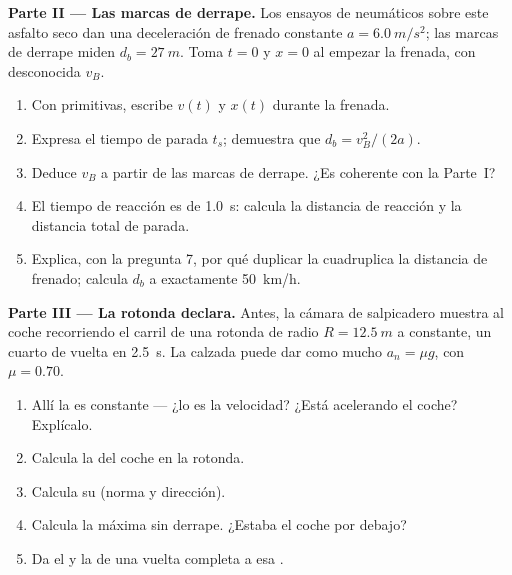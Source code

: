 \begin{problem}
\medskip
\noindent\textbf{Parte II --- Las marcas de derrape.}
Los ensayos de neumáticos sobre este asfalto seco dan una deceleración
de frenado constante $a = \qty{6.0}{m/s^2}$; las marcas de derrape miden
$d_b = \qty{27}{m}$. Toma $t = 0$ y $x = 0$ al empezar la frenada, con
 desconocida $v_B$.
\begin{enumerate}[resume]
  \item Con primitivas, escribe $v(t)$ y $x(t)$ durante la frenada.
  \item Expresa el tiempo de parada $t_s$; demuestra que
        $d_b = v_B^2/(2a)$.
  \item Deduce $v_B$ a partir de las marcas de derrape. ¿Es coherente
        con la Parte~I?
  \item El tiempo de reacción es de \qty{1.0}{s}: calcula la distancia
        de reacción y la distancia total de parada.
  \item Explica, con la pregunta 7, por qué duplicar la 
        cuadruplica la distancia de frenado; calcula $d_b$ a exactamente
        \qty{50}{km/h}.
\end{enumerate}

\medskip
\noindent\textbf{Parte III --- La rotonda declara.}
Antes, la cámara de salpicadero muestra al coche recorriendo el carril
de una rotonda de radio $R = \qty{12.5}{m}$ a  constante, un
cuarto de vuelta en \qty{2.5}{s}. La calzada puede dar como mucho
$a_n = \mu g$, con $\mu = 0.70$.
\begin{enumerate}[resume]
  \item Allí la  es constante --- ¿lo es la velocidad? ¿Está
        acelerando el coche? Explícalo.
  \item Calcula la  del coche en la rotonda.
  \item Calcula su  (norma y dirección).
  \item Calcula la  máxima sin derrape. ¿Estaba el coche por
        debajo?
  \item Da el  y la  de una vuelta completa a esa
        .
\end{enumerate}


\end{problem}
